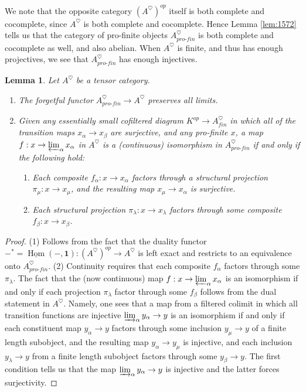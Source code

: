 \documentclass[reqno]{amsart}
\newtheorem{lemma}{Lemma}[section]
\theoremstyle{definition}
\newcommand{\pf}{pro\text{-}fin}
\DeclareMathOperator{\Hom}{Hom}
\renewcommand{\1}{\mathbf{1}}
\begin{document}
We note that the opposite category $(A^{\heartsuit})^{op}$ itself is both complete and cocomplete, since $A^{\heartsuit}$ is both complete and cocomplete.  Hence Lemma \ref{lem:1572} tells us that the category of pro-finite objects $A^{\heartsuit}_{\pf}$ is both complete and cocomplete as well, and also abelian.  When $A^{\heartsuit}$ is finite, and thus has enough projectives, we see that $A^{\heartsuit}_{\pf}$ has enough injectives.

\begin{lemma}\label{lem:pf_limits}
Let $A^{\heartsuit}$ be a tensor category.
\begin{enumerate}
\item The forgetful functor $A^{\heartsuit}_{\pf}\to A^{\heartsuit}$ preserves all limits.\vspace{1mm}
\item Given any essentially small cofiltered diagram $K^{op}\to A^{\heartsuit}_{fin}$ in which all of the transition maps $x_{\alpha}\to x_{\beta}$ are surjective, and any pro-finite $x$, a map $f:x\to \varprojlim_{\alpha}x_{\alpha}$ in $A^{\heartsuit}$ is a (continuous) isomorphism in $A^{\heartsuit}_{\pf}$ if and only if the following hold:\vspace{1mm}
\begin{enumerate}
\item Each composite $f_{\alpha}:x\to x_{\alpha}$ factors through a structural projection $\pi_{\mu}:x\to x_{\mu}$, and the resulting map $x_{\mu}\to x_{\alpha}$ is surjective.\vspace{1mm}
\item Each structural projection $\pi_{\lambda}:x\to x_{\lambda}$ factors through some composite $f_{\beta}:x\to x_{\beta}$.
\end{enumerate}
\end{enumerate}
\end{lemma}

\begin{proof}
(1) Follows from the fact that the duality functor $-^{\ast}=\underline{\Hom}(-,\1):(A^{\heartsuit})^{op}\to A^{\heartsuit}$ is left exact and restricts to an equivalence onto $A^{\heartsuit}_{\pf}$. (2) Continuity requires that each composite $f_{\alpha}$ factors through some $\pi_{\lambda}$.  The fact that the (now continuous) map $f:x\to \varprojlim_{\alpha} x_{\alpha}$ is an isomorphism if and only if each projection $\pi_{\lambda}$ factor through some $f_{\beta}$ follows from the dual statement in $A^{\heartsuit}$.  Namely, one sees that a map from a filtered colimit in which all transition functions are injective $\varinjlim_{\alpha}y_{\alpha}\to y$ is an isomorphism if and only if each constituent map $y_{\alpha}\to y$ factors through some inclusion $y_{\mu}\to y$ of a finite length subobject, and the resulting map $y_{\alpha}\to y_{\mu}$ is injective, and each inclusion $y_{\lambda}\to y$ from a finite length subobject factors through some $y_{\beta}\to y$.  The first condition tells us that the map $\varinjlim_{\alpha}y_{\alpha}\to y$ is injective and the latter forces surjectivity.
\end{proof}
\end{document}

